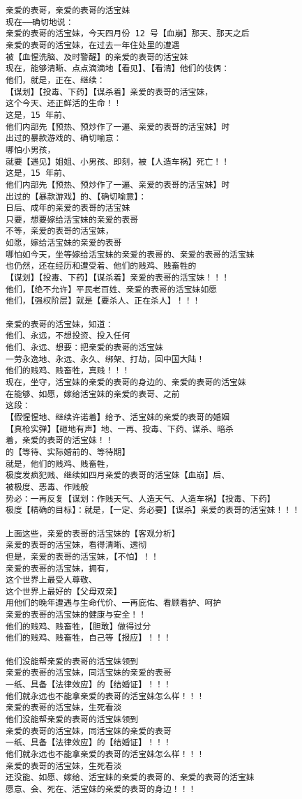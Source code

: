 \documentclass[9pt, b5paper]{article}
\begin{document}
\begin{verbatim}
亲爱的表哥，亲爱的表哥的活宝妹
现在——确切地说：
亲爱的表哥的活宝妹，今天四月份 12 号【血崩】那天、那天之后
亲爱的表哥的活宝妹，在过去一年住处里的遭遇
被【血惺洗脑、及时警醒】的亲爱的表哥的活宝妹
现在，能够清晰、点点滴滴地【看见】、【看清】他们的伎俩：
他们，就是，正在、继续：
【谋划】【投毒、下药】【谋杀着】亲爱的表哥的活宝妹，
这个今天、还正鲜活的生命！！
这是，15 年前、
他们内部先【预热、预炒作了一遍、亲爱的表哥的活宝妹】时
出过的暴款游戏的、确切喻意：
哪怕小男孩，
就要【遇见】姐姐、小男孩、即刻，被【人造车祸】死亡！！
这是，15 年前、
他们内部先【预热、预炒作了一遍、亲爱的表哥的活宝妹】时
出过的【暴款游戏】的、【确切喻意】：
日后、成年的亲爱的表哥的活宝妹
只要，想要嫁给活宝妹的亲爱的表哥
不等，亲爱的表哥的活宝妹，
如愿，嫁给活宝妹的亲爱的表哥
哪怕如今天，坐等嫁给活宝妹的亲爱的表哥的、亲爱的表哥的活宝妹
也仍然，还在经历和遭受着、他们的贱鸡、贱畜牲的
【谋划】【投毒、下药】【谋杀着】亲爱的表哥的活宝妹！！！
他们，【绝不允许】平民老百姓、亲爱的表哥的活宝妹如愿
他们，【强权阶层】就是【要杀人、正在杀人】！！！

亲爱的表哥的活宝妹，知道：
他们、永远，不想投资、投入任何
他们、永远、想要：把亲爱的表哥的活宝妹
一劳永逸地、永远、永久、绑架、打劫，回中国大陆！
他们的贱鸡、贱畜牲，真贱！！！
现在，坐守，活宝妹的亲爱的表哥的身边的、亲爱的表哥的活宝妹 
在能够、如愿，嫁给活宝妹的亲爱的表哥、之前
这段：
【假惺惺地、继续许诺着】给予、活宝妹的亲爱的表哥的婚姻
【真枪实弹】【砸地有声】地、一再、投毒、下药、谋杀、暗杀
着，亲爱的表哥的活宝妹！！
的【等待、实际婚前的、等待期】
就是，他们的贱鸡、贱畜牲，
极度发疯犯贱、继续如四月亲爱的表哥的活宝妹【血崩】后、
被极度、恶毒、作贱般
势必：一再反复【谋划：作贱天气、人造天气、人造车祸】【投毒、下药】
极度【精确的目标】：就是，【一定、务必要】【谋杀】亲爱的表哥的活宝妹！！！

上面这些，亲爱的表哥的活宝妹的【客观分析】
亲爱的表哥的活宝妹，看得清晰、透彻
但是，亲爱的表哥的活宝妹，【不怕】！！
亲爱的表哥的活宝妹，拥有，
这个世界上最受人尊敬、
这个世界上最好的【父母双亲】
用他们的晚年遭遇与生命代价、一再庇佑、看顾看护、呵护
亲爱的表哥的活宝妹的健康与安全！！
他们的贱鸡、贱畜牲，【胆敢】做得过分
他们的贱鸡、贱畜牲，自己等【报应】！！！

他们没能帮亲爱的表哥的活宝妹领到
亲爱的表哥的活宝妹，同活宝妹的亲爱的表哥
一纸、具备【法律效应】的【结婚证】！！！
他们就永远也不能拿亲爱的表哥的活宝妹怎么样！！！
亲爱的表哥的活宝妹，生死看淡
他们没能帮亲爱的表哥的活宝妹领到
亲爱的表哥的活宝妹，同活宝妹的亲爱的表哥
一纸、具备【法律效应】的【结婚证】！！！
他们就永远也不能拿亲爱的表哥的活宝妹怎么样！！！
亲爱的表哥的活宝妹，生死看淡
还没能、如愿、嫁给、活宝妹的亲爱的表哥的、亲爱的表哥的活宝妹
愿意、会、死在、活宝妹的亲爱的表哥的身边！！！


\end{verbatim}
\end{document}
